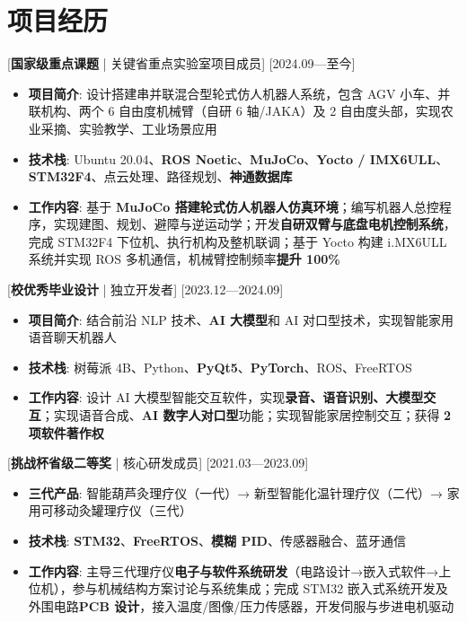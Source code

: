 \documentclass{resume-photo}
\newcommand{\hl}[1]{\textbf{\textcolor{hlred}{#1}}}
\begin{document}
\section{项目经历}

[\textnormal{\hl{国家级重点课题} | 关键省重点实验室项目成员}]
[2024.09—至今]

\begin{itemize}
  \item \textbf{项目简介}: 设计搭建串并联混合型轮式仿人机器人系统，包含 AGV 小车、并联机构、两个 6 自由度机械臂（自研 6 轴/JAKA）及 2 自由度头部，实现农业采摘、实验教学、工业场景应用
  \item \textbf{技术栈}: Ubuntu 20.04、\hl{ROS Noetic}、\hl{MuJoCo}、\hl{Yocto / IMX6ULL}、\hl{STM32F4}、点云处理、路径规划、\hl{神通数据库}
  \item \textbf{工作内容}: 基于 \hl{MuJoCo 搭建轮式仿人机器人仿真环境}；编写机器人总控程序，实现建图、规划、避障与逆运动学；开发\hl{自研双臂与底盘电机控制系统}，完成 STM32F4 下位机、执行机构及整机联调；基于 Yocto 构建 i.MX6ULL 系统并实现 ROS 多机通信，机械臂控制频率\hl{提升 100\%}
\end{itemize}

[\textnormal{\hl{校优秀毕业设计} | 独立开发者}]
[2023.12—2024.09]

\begin{itemize}
  \item \textbf{项目简介}: 结合前沿 NLP 技术、\hl{AI 大模型}和 AI 对口型技术，实现智能家用语音聊天机器人
  \item \textbf{技术栈}: 树莓派 4B、Python、\hl{PyQt5}、\hl{PyTorch}、ROS、FreeRTOS
  \item \textbf{工作内容}: 设计 AI 大模型智能交互软件，实现\hl{录音、语音识别、大模型交互}；实现语音合成、\hl{AI 数字人对口型}功能；实现智能家居控制交互；获得 \hl{2 项软件著作权}
\end{itemize}

[\textnormal{\hl{挑战杯省级二等奖} | 核心研发成员}]
[2021.03—2023.09]

\begin{itemize}
  \item \textbf{三代产品}: 智能葫芦灸理疗仪（一代）→ 新型智能化温针理疗仪（二代）→ 家用可移动灸罐理疗仪（三代）
  \item \textbf{技术栈}: \hl{STM32}、\hl{FreeRTOS}、\hl{模糊 PID}、传感器融合、蓝牙通信
  \item \textbf{工作内容}: 主导三代理疗仪\hl{电子与软件系统研发}（电路设计→嵌入式软件→上位机），参与机械结构方案讨论与系统集成；完成 STM32 嵌入式系统开发及外围电路\hl{PCB 设计}，接入温度/图像/压力传感器，开发伺服与步进电机驱动
\end{itemize}
\end{document}
